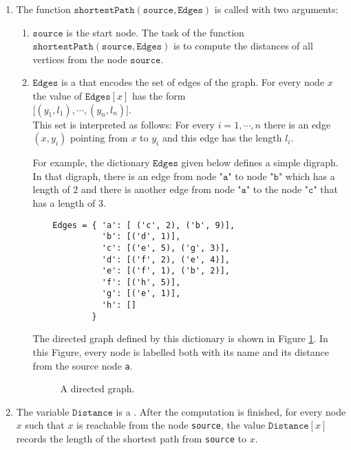 \noindent
\begin{enumerate}
\item The function $\texttt{shortestPath}(\texttt{source}, \texttt{Edges})$ is called with two arguments:
      \begin{enumerate}
      \item $\texttt{source}$ is the start node.  The task of the function
            $\texttt{shortestPath}(\texttt{source}, \texttt{Edges})$ is to compute the distances of all 
            vertices from the node $\texttt{source}$.
      \item $\texttt{Edges}$ is a  that encodes the set of edges of the graph.  For
            every node $x$ the value of $\texttt{Edges}[x]$ has the form
            \\[0.2cm]
            \hspace*{1.3cm}
            $\bigl[ (y_1, l_1), \cdots, (y_n, l_n) \bigr]$.
            \\[0.2cm]
            This set is interpreted as follows: For every $i = 1,\cdots,n$ there is an edge
            $(x, y_i)$ pointing from $x$ to $y_i$ and this edge has the length $l_i$.

            For example, the dictionary $\texttt{Edges}$ given below defines a simple digraph.
            In that digraph, there is an edge from node $\texttt{"a"}$ to node $\texttt{"b"}$ which has a
            length of $2$ and there is another edge from node $\texttt{"a"}$ to the node $\texttt{"c"}$ that has a length of $3$.
            \begin{verbatim}
    Edges = { 'a': [ ('c', 2), ('b', 9)], 
              'b': [('d', 1)],
              'c': [('e', 5), ('g', 3)],  
              'd': [('f', 2), ('e', 4)],  
              'e': [('f', 1), ('b', 2)],
              'f': [('h', 5)],
              'g': [('e', 1)],
              'h': []
            }
            \end{verbatim}
      
      The directed graph defined by this dictionary is shown in Figure \ref{fig:directed-graph.pdf}.
      In this Figure, every node is labelled both with its name and its distance from the source node \texttt{a}.
      \begin{figure}[!ht]
        \centering
        \hspace*{-1.5cm}
        \caption{A directed graph.}
        \label{fig:directed-graph.pdf}
      \end{figure}
      \end{enumerate}
\item The variable $\texttt{Distance}$ is a .  After the computation is
      finished, for every node $x$ such that $x$ is reachable from the node \texttt{source},
      the value $\texttt{Distance}[x]$ records the length of the shortest path from \texttt{source} to $x$.


\end{enumerate}

